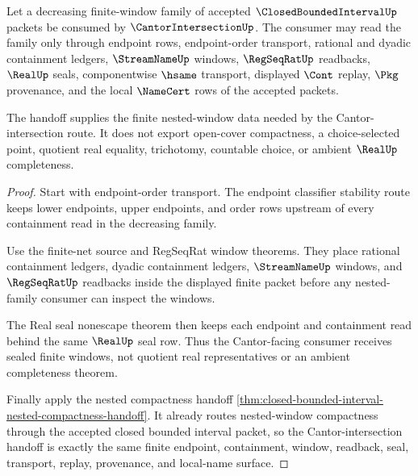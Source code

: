 \begin{theorem}
\label{thm:closed-bounded-interval-cantor-intersection-handoff}
Let a decreasing finite-window family of accepted $\ClosedBoundedIntervalUp$ packets be consumed by $\CantorIntersectionUp$. The consumer may read the family only through endpoint rows, endpoint-order transport, rational and dyadic containment ledgers, $\StreamNameUp$ windows, $\RegSeqRatUp$ readbacks, $\RealUp$ seals, componentwise $\hsame$ transport, displayed $\Cont$ replay, $\Pkg$ provenance, and the local $\NameCert$ rows of the accepted packets.

The handoff supplies the finite nested-window data needed by the Cantor-intersection route. It does not export open-cover compactness, a choice-selected point, quotient real equality, trichotomy, countable choice, or ambient $\RealUp$ completeness.
\end{theorem}
\begin{proof}
Start with endpoint-order transport. The endpoint classifier stability route keeps lower endpoints, upper endpoints, and order rows upstream of every containment read in the decreasing family.

Use the finite-net source and RegSeqRat window theorems. They place rational containment ledgers, dyadic containment ledgers, $\StreamNameUp$ windows, and $\RegSeqRatUp$ readbacks inside the displayed finite packet before any nested-family consumer can inspect the windows.

The Real seal nonescape theorem then keeps each endpoint and containment read behind the same $\RealUp$ seal row. Thus the Cantor-facing consumer receives sealed finite windows, not quotient real representatives or an ambient completeness theorem.

Finally apply the nested compactness handoff \autoref{thm:closed-bounded-interval-nested-compactness-handoff}. It already routes nested-window compactness through the accepted closed bounded interval packet, so the Cantor-intersection handoff is exactly the same finite endpoint, containment, window, readback, seal, transport, replay, provenance, and local-name surface.
\end{proof}

